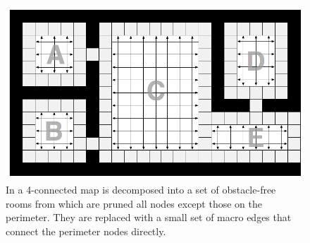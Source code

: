 \begin{figure}[tb]
       \begin{center}
                       \includegraphics[scale=0.30, trim = 10mm 10mm 10mm 0mm]{diagrams/overview.png}
       \end{center}
	\vspace{-3pt}
       \caption{In \cite{harabor10} a 4-connected map is decomposed into a set of obstacle-free rooms from which are pruned all nodes except those on the perimeter.
				They are replaced with a small set of macro edges that connect the perimeter nodes directly.}
       \label{fig-overview}
\end{figure}

